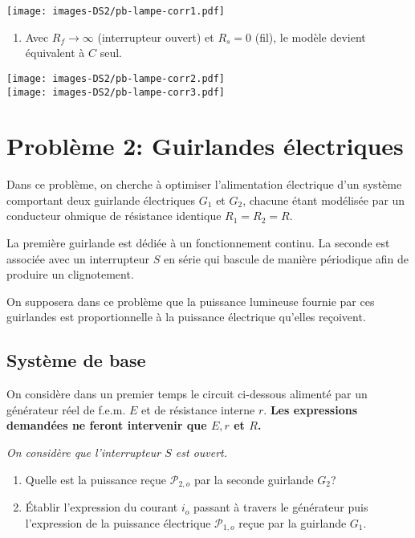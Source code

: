 \texttt{[image: images-DS2/pb-lampe-corr1.pdf]}

\begin{enumerate}
\def\labelenumi{\arabic{enumi}.}
\setcounter{enumi}{2}
\tightlist
\item
  Avec \(R_f\to\infty\) (interrupteur ouvert) et \(R_s = 0\) (fil), le
  modèle devient équivalent à \(C\) seul.
\end{enumerate}

\texttt{[image: images-DS2/pb-lampe-corr2.pdf]}\\
\texttt{[image: images-DS2/pb-lampe-corr3.pdf]}

\hypertarget{probluxe8me-2-guirlandes-uxe9lectriques}{%
\section*{Problème 2: Guirlandes
électriques}\label{probluxe8me-2-guirlandes-uxe9lectriques}}

Dans ce problème, on cherche à optimiser l'alimentation électrique d'un
système comportant deux guirlande électriques \(G_1\) et \(G_2\),
chacune étant modélisée par un conducteur ohmique de résistance
identique \(R_1 = R_2 = R\).

La première guirlande est dédiée à un fonctionnement continu. La seconde
est associée avec un interrupteur \(S\) en série qui bascule de manière
périodique afin de produire un clignotement.

On supposera dans ce problème que la puissance lumineuse fournie par ces
guirlandes est proportionnelle à la puissance électrique qu'elles
reçoivent.

\hypertarget{systuxe8me-de-base}{%
\subsection*{Système de base}\label{systuxe8me-de-base}}

On considère dans un premier temps le circuit ci-dessous alimenté par un
générateur réel de f.e.m. \(E\) et de résistance interne \(r\).
\textbf{Les expressions demandées ne feront intervenir que \(E,r\) et
\(R\).}

\emph{On considère que l'interrupteur \(S\) est ouvert.}

\begin{enumerate}
\def\labelenumi{\arabic{enumi}.}
\item
  Quelle est la puissance reçue \(\mathcal{P}_{2,o}\) par la seconde
  guirlande \(G_2\)?
\item
  Établir l'expression du courant \(i_o\) passant à travers le
  générateur puis l'expression de la puissance électrique
  \(\mathcal{P}_{1,o}\) reçue par la guirlande \(G_1\).
\end{enumerate}

